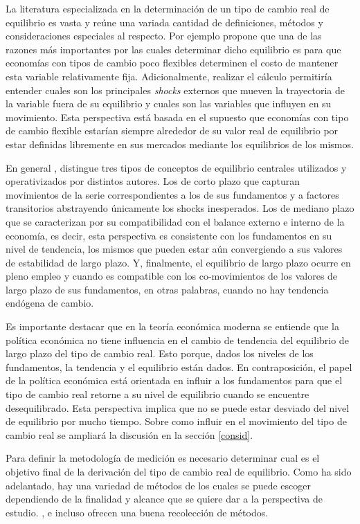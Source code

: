 \documentclass[12pt,letterpaper]{article}
\begin{document}
La literatura especializada en la determinación de un tipo de cambio real de equilibrio es vasta y reúne una variada cantidad de definiciones, métodos y consideraciones especiales al respecto. Por ejemplo \cite{driver2005concepts} propone que una de las razones más importantes por las cuales determinar dicho equilibrio es para que economías con tipos de cambio poco flexibles determinen el costo de mantener esta variable relativamente fija. Adicionalmente, realizar el cálculo permitiría entender cuales son los principales \emph{shocks} externos que mueven la trayectoria de la variable fuera de su equilibrio y cuales son las variables que influyen en su movimiento. Esta perspectiva está basada en el supuesto que economías con tipo de cambio flexible estarían siempre alrededor de su valor real de equilibrio por estar definidas libremente en sus mercados mediante los equilibrios de los mismos.

En general \cite{driver2005concepts}, distingue tres tipos de conceptos de equilibrio centrales utilizados y operativizados por distintos autores. Los de corto plazo que capturan movimientos de la serie correspondientes a los de sus fundamentos y a factores transitorios abstrayendo únicamente los shocks inesperados. Los de mediano plazo que se caracterizan por su compatibilidad con el balance externo e interno de la economía, es decir, esta perspectiva es consistente con los fundamentos en su nivel de tendencia, los mismos que pueden estar aún convergiendo a sus valores de estabilidad de largo plazo. Y, finalmente, el equilibrio de largo plazo ocurre en pleno empleo y cuando es compatible con los co-movimientos de los valores de largo plazo de sus fundamentos, en otras palabras, cuando no hay tendencia endógena de cambio.

Es importante destacar que en la teoría económica moderna se entiende que la política económica no tiene influencia en el cambio de tendencia del equilibrio de largo plazo del tipo de cambio real. Esto porque, dados los niveles de los fundamentos, la tendencia y el equilibrio están dados. En contraposición, el papel de la política económica está orientada en influir a los fundamentos para que el tipo de cambio real retorne a su nivel de equilibrio cuando se encuentre desequilibrado. Esta perspectiva implica que no se puede estar desviado del nivel de equilibrio por mucho tiempo. Sobre como influir en el movimiento del tipo de cambio real se ampliará la discusión en la sección \ref{consid}.

Para definir la metodología de medición es necesario determinar cual es el objetivo final de la derivación del tipo de cambio real de equilibrio. Como ha sido adelantado, hay una variedad de métodos de los cuales se puede escoger dependiendo de la finalidad y alcance que se quiere dar a la perspectiva de estudio. \cite{driver2005concepts}, \cite{macdonald2000concepts} e incluso \cite{akrama2003real} ofrecen una buena recolección de métodos.
\end{document}
